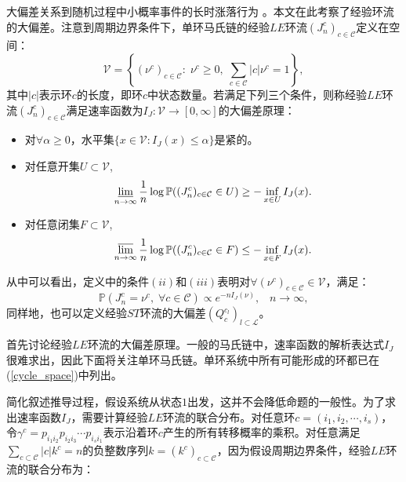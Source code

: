 大偏差关系到随机过程中小概率事件的长时涨落行为 \cite{varadhan1984large,den2000large}。本文在此考察了经验环流的大偏差。注意到周期边界条件下，单环马氏链的经验$LE$环流$(J_n^c)_{c \in \mathcal{C}}$定义在空间：
\begin{equation*}
    \mathcal{V} = \left\{(\nu^c)_{c\in \mathcal{C}}:\;\nu^c\geq 0,\;
    \sum_{c\in \mathcal{C}}|c|\nu^c  = 1\right\},
\end{equation*}
其中$|c|$表示环$c$的长度，即环$c$中状态数量。若满足下列三个条件\cite{varadhan1984large}，则称经验$LE$环流$(J_n^c)_{c \in \mathcal{C}}$满足速率函数为$I_J:\mathcal{V}\rightarrow [0,\infty]$的大偏差原理：
\begin{itemize}
    \item 对$\forall \alpha \geqslant 0$，水平集$\{x \in \mathcal{V}: I_{J}(x) \leqslant \alpha\}$是紧的。
    \item 对任意开集$U \subset \mathcal{V}$,
        \begin{equation}\label{def1}
            \varliminf_{n\to\infty}\frac{1}{n}\log\mathbb{P}((J^c_n)_{c\in\mathcal{C}}\in U)\ge-\inf_{x\in U}I_J(x).
        \end{equation}
    \item 对任意闭集$F \subset \mathcal{V}$,
        \begin{equation}\label{def2}
            \varlimsup_{n\to \infty}\frac{1}{n}\log\mathbb{P}((J^c_n)_{c\in\mathcal{C}}\in F)\le -\inf_{x\in F}I_J(x).
        \end{equation}
\end{itemize}
从中可以看出，定义中的条件$(ii)$和$(iii)$表明对$\forall (\nu^c)_{c\in\mathcal{C}}\in\mathcal{V}$，满足：
\begin{equation}\label{LDP}
    \mathbb{P}(J^c_n=\nu^c,\;\forall c\in\mathcal{C})\propto e^{-n I_J(\nu)},\;\;\;n\to\infty,
\end{equation}
同样地，也可以定义经验$ST$环流的大偏差$(Q_c^{c_l})_{l \subset \mathcal{L}}$。

首先讨论经验$LE$环流的大偏差原理。一般的马氏链中，速率函数的解析表达式$I_J$很难求出，因此下面将关注单环马氏链。单环系统中所有可能形成的环都已在 (\ref{cycle_space})中列出。

简化叙述推导过程，假设系统从状态$1$出发，这并不会降低命题的一般性。为了求出速率函数$I_J$，需要计算经验$LE$环流的联合分布。对任意环$c=(i_1, i_2, \cdots, i_s)$，令$\gamma^c = p_{i_1i_2}p_{i_2i_3}\cdots p_{i_si_1}$表示沿着环$c$产生的所有转移概率的乘积。对任意满足$\sum_{c \subset \mathcal{C}} |c| k^c=n$的负整数序列$k=(k^c)_{c\subset \mathcal{C}}$，因为假设周期边界条件，经验$LE$环流的联合分布为：

